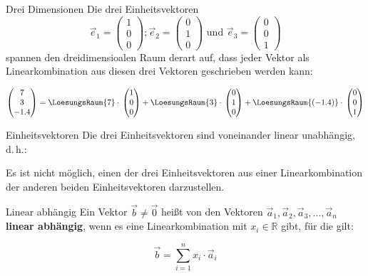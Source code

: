 \begin{bemerkung}{Drei Dimensionen}{}
  Die drei Einheitsvektoren
  $$\vec{e}_1=\begin{pmatrix}1\\0\\0\end{pmatrix};
  \vec{e}_2=\begin{pmatrix}0\\1\\0\end{pmatrix} \text{ und }
  \vec{e}_3=\begin{pmatrix}0\\0\\1\end{pmatrix}$$
spannen den dreidimensioalen Raum derart auf, dass jeder Vektor als
Linearkombination aus diesen drei Vektoren geschrieben werden kann:

$$\begin{pmatrix}7\\3\\-1.4\end{pmatrix}=
  \LoesungsRaum{7}\cdot{}\begin{pmatrix}1\\0\\0\end{pmatrix} +
  \LoesungsRaum{3}\cdot{}\begin{pmatrix}0\\1\\0\end{pmatrix} +
  \LoesungsRaum{(-1.4)}\cdot{}\begin{pmatrix}0\\0\\1\end{pmatrix}$$
\end{bemerkung}

\begin{gesetz}{Einheitsvektoren}{}
  Die drei Einheitsvektoren sind voneinander linear unabhängig, d.\,h.:

  Es ist nicht möglich, einen der drei Einheitsvektoren aus einer
  Linearkombination der anderen beiden Einheitsvektoren darzustellen.
\end{gesetz}

\begin{definition}{Linear abhängig}{}
  Ein Vektor $\vec{b}\ne \vec{0}$ heißt von den Vektoren $\vec{a}_1, \vec{a}_2,
  \vec{a}_3, ... , \vec{a}_n$ \textbf{linear abhängig}, wenn es eine
  Linearkombination mit $x_i \in \mathbb{R}$ gibt, für die gilt:

  $$\vec{b} = \sum_{i=1}^{n}x_i\cdot{}\vec{a}_i$$
  \end{definition}
\newpage

